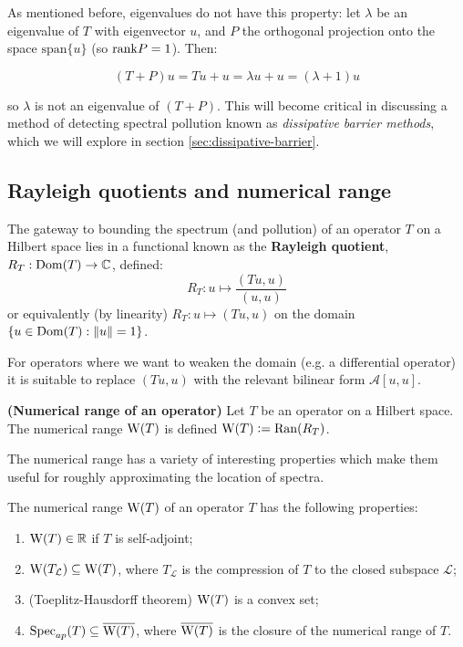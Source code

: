 \documentclass[../main.tex]{subfiles}
\begin{document}
\begin{remark}
As mentioned before, eigenvalues do not have this property: let $\lambda$ be an
eigenvalue of $T$ with eigenvector $u$, and $P$ the orthogonal
projection onto the space $\mathrm{span}\{u\}$ (so $\mathrm{rank} P = 1$). Then:

$$(T+P) u = Tu + u = \lambda u + u = (\lambda + 1)u$$

so $\lambda$ is not an eigenvalue of $(T+P)$. This will become critical in
discussing a method of detecting spectral pollution known as
\emph{dissipative barrier methods}, which we will explore in section
\ref{sec:dissipative-barrier}.
\end{remark}

\subsection{Rayleigh quotients and numerical range}
The gateway to bounding the spectrum (and pollution) of an operator $T$ on a
Hilbert space lies in a functional known as the \textbf{Rayleigh
quotient}, $R_T: \mathrm{Dom}(T) \rightarrow \mathbb{C}$,
defined:
\begin{equation*}
  R_T: u \mapsto \frac{( Tu, u )}{(u, u)}
\end{equation*} 
or equivalently (by linearity) $R_T: u \mapsto (Tu, u)$ on the domain $\{u \in
\mathrm{Dom}(T) : \|u\| = 1\}$.
 
For operators where we want to weaken the domain (e.g. a differential operator)
it is suitable to replace $(Tu, u)$ with the relevant bilinear form
$\mathcal{A}[u, u].$

\begin{definition}{\textbf{(Numerical range of an operator)}}
  Let $T$ be an operator on a Hilbert space. The
  numerical range $\mathrm{W}(T)$ is defined $\mathrm{W}(T) \mathrel{\mathop:}= \mathrm{Ran}(R_T)$.
\end{definition}

The numerical range has a variety of interesting properties which make them
useful for roughly approximating the location of spectra.

\begin{proposition}
\label{thm:num-range-props}
  The numerical range $\mathrm{W}(T)$ of an operator $T$ has the following properties:
  \begin{enumerate}
    \item
    \label{item:num-in-R}
	$\mathrm{W}(T) \in \mathbb{R}$ if $T$ is self-adjoint;
    \item
    \label{item:proj-num-range} 
	$\mathrm{W}(T_\mathcal{L}) \subseteq \mathrm{W}(T)$, where $T_\mathcal{L}$ is the compression of $T$ to the closed subspace $\mathcal{L}$;
    \item (Toeplitz-Hausdorff theorem)
    \label{item:toeplitz-hausdorff}
      $\mathrm{W}(T)$ is a convex set;
    \item
    \label{item:spec-in-num} 
      $\mathrm{Spec}_{ap}(T) \subseteq \overline{\mathrm{W}(T)}$,
     where $\overline{\mathrm{W}(T)}$ is the closure of the numerical range of $T$.
  \end{enumerate}
\end{proposition}
\end{document}
